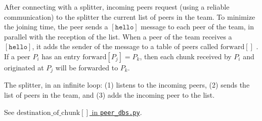 
\label{sec:joining}

After connecting with a splitter, incoming peers request (using a
reliable communication) to the splitter the current list of peers in
the team. To minimize the joining time, the peer sends a
$[\mathtt{hello}]$ message to each peer of the team, in parallel
with the reception of the list. When a peer of the team receives a
$[\mathtt{hello}]$, it adds the sender of the message to a table of peers
called $\text{forward}[]$ . If a peer $P_i$ has an entry
$\text{forward}[P_j]=P_k$, then each chunk received by $P_i$ and
originated at $P_j$ will be forwarded to $P_k$.


The splitter, in an infinite loop: (1) listens to the incoming peers, (2) sends
the list of peers in the team, and (3) adds the incoming peer to the
list.

\begin{comment}
\begin{figure*}
  \fig{1000}{10cm}{joining} \caption{Code related to team
    joining.\label{fig:joining}}
\end{figure*}

The new pseudo-code related to joining a team is describen in the
Fig.~\ref{fig:joining}.
\end{comment}

\begin{notex}
  See \href{https://github.com/P2PSP/simulator/blob/f0c73be1817e7d3b816cc61cd2c8e59b17f9a0e6/src/core/splitter_dbs.py#L296}{$\text{destination\_of\_chunk}[]$ in \texttt{peer\_dbs.py}}.
\end{notex}
